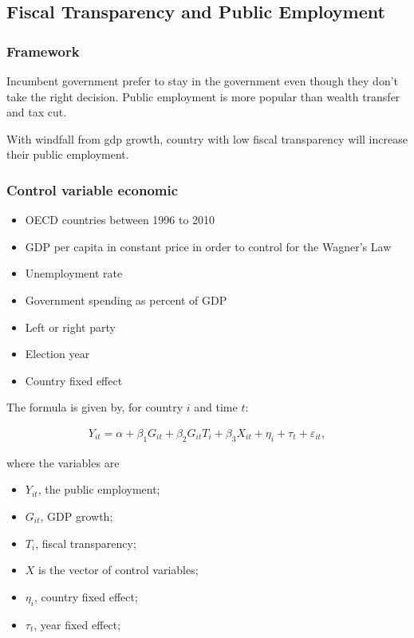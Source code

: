 \subsection{Fiscal Transparency and Public
Employment}\label{fiscal-transparency-and-public-employment}

\subsubsection{Framework}\label{framework}

Incumbent government prefer to stay in the government even though they
don't take the right decision. Public employment is more popular than
wealth transfer and tax cut.

With windfall from gdp growth, country with low fiscal transparency will
increase their public employment.

\subsubsection{Control variable
economic}\label{control-variable-economic}

\begin{itemize}
\itemsep1pt\parskip0pt
\item
  OECD countries between 1996 to 2010
\item
  GDP per capita in constant price in order to control for the Wagner's
  Law
\item
  Unemployment rate
\item
  Government spending as percent of GDP
\item
  Left or right party
\item
  Election year
\item
  Country fixed effect
\end{itemize}

The formula is given by, for country \(i\) and time \(t\):

\begin{align*}
Y_{it} = \alpha + \beta_1 G_{it} + \beta_2 G_{it} T_i + \beta_3 X_{it} + \eta_i + \tau_t + \varepsilon_{it},
\end{align*}

where the variables are

\begin{itemize}
\itemsep1pt\parskip0pt
\item
  \(Y_{it}\), the public employment;
\item
  \(G_{it}\), GDP growth;
\item
  \(T_{i}\), fiscal transparency;
\item
  \(X\) is the vector of control variables;
\item
  \(\eta_i\), country fixed effect;
\item
  \(\tau_t\), year fixed effect;
\end{itemize}

